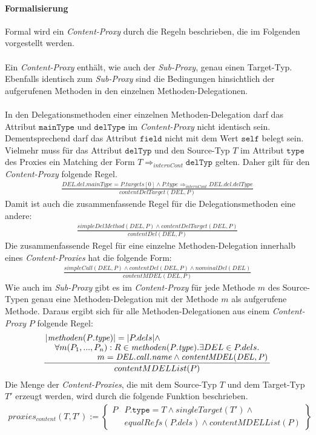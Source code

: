 \documentclass[a4paper,12pt]{article}
\begin{document}
\paragraph{Formalisierung}
Formal wird ein \emph{Content-Proxy} durch die Regeln beschrieben, die im Folgenden vorgestellt werden.\\\\
Ein \emph{Content-Proxy} enthält, wie auch der \emph{Sub-Proxy}, genau einen Target-Typ. Ebenfalls identisch zum \emph{Sub-Proxy} sind die Bedingungen hinsichtlich der aufgerufenen Methoden in den einzelnen Methoden-Delegationen.\\\\
In den Delegationsmethoden einer einzelnen Methoden-Delegation darf das Attribut $\texttt{mainType}$ und $\texttt{delType}$ im \emph{Content-Proxy} nicht identisch sein. Dementsprechend darf das Attribut $\texttt{field}$ nicht mit dem Wert $\texttt{self}$ belegt sein. Vielmehr muss für das Attribut $\texttt{delTyp}$ und den Source-Typ $T$ im Attribut $\texttt{type}$ des Proxies ein Matching der Form $T \Rightarrow_{internCont} \texttt{delTyp}$ gelten. Daher gilt für den \emph{Content-Proxy} folgende Regel.
\begin{gather*}
\frac{\mathit{DEL.del.mainType} = \mathit{P.targets[0]} \wedge \mathit{P.type} \Rightarrow_{internCont} \mathit{DEL.del.delType}}
{\mathit{contentDelTarget(DEL,P)}}
\end{gather*}
\noindent
Damit ist auch die zusammenfassende Regel für die Delegationsmethoden eine andere:
\begin{gather*}
\frac{\mathit{simpleDelMethod(DEL,P)} \wedge \mathit{contentDelTarget(DEL,P)}}
{contentDel(DEL,P)}
\end{gather*}
Die zusammenfassende Regel für eine einzelne Methoden-Delegation innerhalb eines \emph{Content-Proxies} hat die folgende Form:
\begin{gather*}
\frac{\mathit{simpleCall(DEL,P)} \wedge \mathit{contentDel(DEL,P) \wedge \mathit{nominalDel(DEL)}}}
{contentMDEL(DEL,P)}
\end{gather*}
Wie auch im \emph{Sub-Proxy} gibt es im \emph{Content-Proxy} für jede Methode $m$ des Source-Typen genau eine Methoden-Delegation mit der Methode $m$ als aufgerufene Methode. Daraus ergibt sich für alle Methoden-Delegationen aus einem \emph{Content-Proxy} $P$ folgende Regel:
\begin{gather*}
\frac{\splitfrac{|\mathit{methoden(P.type)}| = |P.dels| \wedge}{ \splitfrac{\forall m(P_1,...,P_n):R \in \mathit{methoden(P.type)}.\exists DEL \in P.dels.}{m = \mathit{DEL.call.name} \wedge \mathit{contentMDEL(DEL,P)}
 }}
}
{contentMDELList(P)}
\end{gather*}
Die Menge der \emph{Content-Proxies}, die mit dem Source-Typ $T$ und dem Target-Typ $T'$ erzeugt werden, wird durch die folgende Funktion beschrieben.
\begin{gather*}
\mathit{proxies_{content}(T,T')} := 
\left\{\begin{array}{l|l}
	P	& P\texttt{.type} = T \wedge  \mathit{singleTarget(T')} \wedge \mathit{ }\\
		& \mathit{equalRefs(P.dels)} \wedge \mathit{contentMDELList(P)} 
		 \end{array}
\right\}
\end{gather*}
\end{document}
